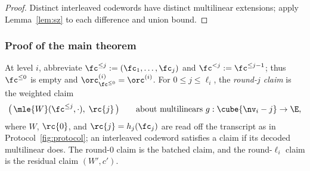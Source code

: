 \begin{proof}
Distinct interleaved codewords have distinct multilinear extensions; apply Lemma~\ref{lem:sz} to each difference and union bound.
\end{proof}

\subsubsection{Proof of the main theorem}\label{pcs:proof}

At level $i$, abbreviate $\fc^{\le j} := (\fc_1, \dots, \fc_j)$ and $\fc^{<j} := \fc^{\le j-1}$; thus $\fc^{\le 0}$ is empty and $\orc^{(i)}_{\fc^{\le 0}} = \orc^{(i)}$. For $0 \le j \le \ell_i$, the \emph{round-$j$ claim} is the weighted claim
\[
\bigl(\, \mle{W}(\fc^{\le j}, \cdot),\; \rc{j} \,\bigr) \qquad \text{about multilinears } g : \cube{\nv_i - j} \to \E,
\]
where $W$, $\rc{0}$, and $\rc{j} = h_j(\fc_j)$ are read off the transcript as in Protocol~\ref{fig:protocol}; an interleaved codeword satisfies a claim if its decoded multilinear does. The round-$0$ claim is the batched claim, and the round-$\ell_i$ claim is the residual claim $(W', c')$.

